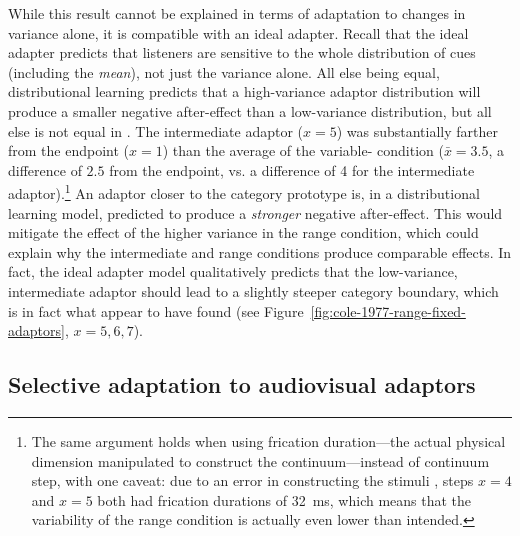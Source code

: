 \label{r2-whole-distribution-3}
While this result cannot be explained in terms of adaptation to changes in variance alone, it is compatible with an ideal adapter.  Recall that the ideal adapter predicts that listeners are sensitive to the whole distribution of cues (including the \emph{mean}), not just the variance alone.  All else being equal, distributional learning predicts that a high-variance adaptor distribution will produce a smaller negative after-effect than a low-variance distribution, but all else is not equal in .  The intermediate  adaptor ($x=5$) was substantially farther from the  endpoint ($x=1$) than the average of the variable- condition ($\bar x = 3.5$, a difference of $2.5$ from the endpoint, vs. a difference of 4 for the intermediate adaptor).\footnote{The same argument holds when using frication duration---the actual physical dimension manipulated to construct the continuum---instead of continuum step, with one caveat: due to an error in constructing the stimuli \cite[Footnote 1]{Cole1977}, steps $x=4$ and $x=5$ both had frication durations of \SI{32}{\milli\second}, which means that the variability of the range condition is actually even lower than intended.}  An adaptor closer to the category prototype is, in a distributional learning model, predicted to produce a \emph{stronger} negative after-effect.  This would mitigate the effect of the higher variance in the range condition, which could explain why the intermediate and range conditions produce comparable effects.  In fact, the ideal adapter model qualitatively predicts that the low-variance, intermediate adaptor should lead to a slightly steeper category boundary, which is in fact what  appear to have found (see Figure~\ref{fig:cole-1977-range-fixed-adaptors}, $x=5,6,7$).


\subsection{Selective adaptation to audiovisual adaptors}
\label{sec:select-adapt-audi}

